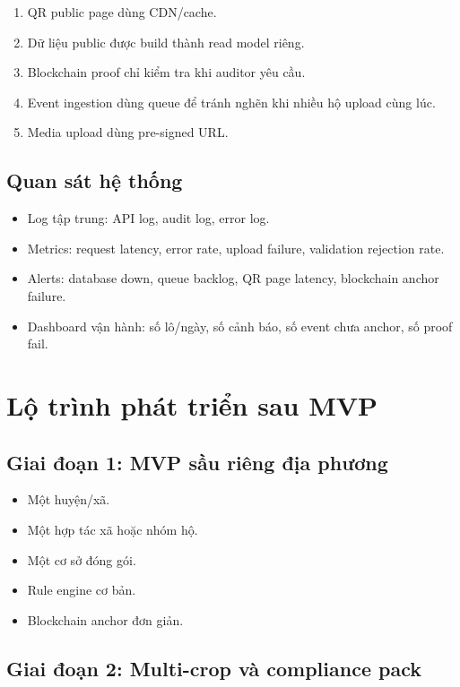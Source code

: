 \documentclass[12pt,a4paper]{article}
\begin{document}
\begin{enumerate}[leftmargin=2em]
    \item QR public page dùng CDN/cache.
    \item Dữ liệu public được build thành read model riêng.
    \item Blockchain proof chỉ kiểm tra khi auditor yêu cầu.
    \item Event ingestion dùng queue để tránh nghẽn khi nhiều hộ upload cùng lúc.
    \item Media upload dùng pre-signed URL.
\end{enumerate}

\subsection{Quan sát hệ thống}

\begin{itemize}[leftmargin=2em]
    \item Log tập trung: API log, audit log, error log.
    \item Metrics: request latency, error rate, upload failure, validation rejection rate.
    \item Alerts: database down, queue backlog, QR page latency, blockchain anchor failure.
    \item Dashboard vận hành: số lô/ngày, số cảnh báo, số event chưa anchor, số proof fail.
\end{itemize}

\section{Lộ trình phát triển sau MVP}

\subsection{Giai đoạn 1: MVP sầu riêng địa phương}

\begin{itemize}[leftmargin=2em]
    \item Một huyện/xã.
    \item Một hợp tác xã hoặc nhóm hộ.
    \item Một cơ sở đóng gói.
    \item Rule engine cơ bản.
    \item Blockchain anchor đơn giản.
\end{itemize}

\subsection{Giai đoạn 2: Multi-crop và compliance pack}
\end{document}
